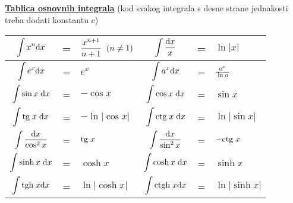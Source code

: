 \documentclass[12pt,oneside,a4paper]{report}
\begin{document}
\vspace{3mm}
\noindent
\underline{\textbf{Tablica osnovnih integrala}}
{\scriptsize(kod svakog integrala s desne strane jednakosti treba dodati konstantu $c$)}
\begin{center}
\begin{tabular}{|ccl|ccl|}
\hline
$\displaystyle \int x^n \textrm dx$ & = & $\displaystyle \frac{x^{n+1}}{n+1}\hspace{2mm} (n\neq 1)$ & 
$\displaystyle \int \frac{\textrm dx }x$ & = & $\displaystyle \ln |x|$\\
\hline

$\displaystyle \int e^x\textrm dx $ & = & $\displaystyle e^x$ & $\displaystyle \int a^x\textrm dx
$ & = & $\displaystyle \frac{a^x}{\ln a}$\\
\hline

$\displaystyle \int \sin x \hspace{1mm}\textrm dx $ & = & $\displaystyle -\cos x$ & $\displaystyle \int \cos x \hspace{1mm}\textrm dx $ & = & $\displaystyle \sin x$\\

$\displaystyle \int \textrm{tg}\hspace{1mm}x\hspace{1mm}\textrm dx $ & = & $\displaystyle -\ln|\cos x|$  &
$\displaystyle \int \textrm{ctg}\hspace{1mm}x\hspace{1mm}\textrm dx $ & = & $\displaystyle \ln|\sin x|$\\

$\displaystyle \int \frac{\textrm dx}{\cos^2 x}$ & = & $\displaystyle \textrm{tg}\hspace{1mm}x $  & $\displaystyle \int
\frac{\textrm dx}{\sin^2 x}$ & = & $\displaystyle -\textrm{ctg}\hspace{1mm}x $\\
\hline

$\displaystyle \int \sinh x\hspace{1mm}\textrm dx$ & = & $\displaystyle  \cosh x$  & $\displaystyle \int \cosh
x\hspace{1mm}\textrm dx$ & = & $\displaystyle  \sinh x$\\

$\displaystyle \int \textrm{tgh}\hspace{1mm}x\textrm dx $ & = & $\displaystyle  \ln |\cosh x|$  & $\displaystyle \int
\textrm{ctgh}\hspace{1mm}x\textrm dx $ & = & $\displaystyle  \ln |\sinh x|$\\


\end{tabular}
\end{center}
\end{document}
